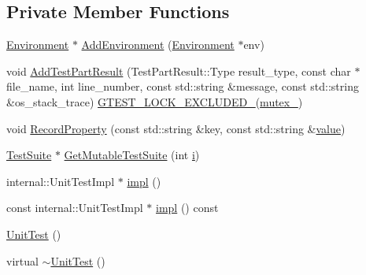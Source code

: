 \subsection*{Private Member Functions}
\begin{DoxyCompactItemize}
\item 
\mbox{\hyperlink{classtesting_1_1_environment}{Environment}} $\ast$ \mbox{\hyperlink{classtesting_1_1_unit_test_a1eb8e999b8696889bf1c64b4f0161203}{Add\+Environment}} (\mbox{\hyperlink{classtesting_1_1_environment}{Environment}} $\ast$env)
\item 
void \mbox{\hyperlink{classtesting_1_1_unit_test_a1d157d2e9a5c1d3405333410c6b13932}{Add\+Test\+Part\+Result}} (Test\+Part\+Result\+::\+Type result\+\_\+type, const char $\ast$file\+\_\+name, int line\+\_\+number, const std\+::string \&message, const std\+::string \&os\+\_\+stack\+\_\+trace) \mbox{\hyperlink{_obj__test_2lib_2googletest-release-1_88_81_2googletest_2include_2gtest_2internal_2gtest-port_8h_a69abff5a4efdd07bd5faebe3dd318d06}{G\+T\+E\+S\+T\+\_\+\+L\+O\+C\+K\+\_\+\+E\+X\+C\+L\+U\+D\+E\+D\+\_\+}}(\mbox{\hyperlink{classtesting_1_1_unit_test_abb94ef45cf0ab43be81ac6d5b1364132}{mutex\+\_\+}})
\item 
void \mbox{\hyperlink{classtesting_1_1_unit_test_a2c96a4a02c34095e07c6999e7686367f}{Record\+Property}} (const std\+::string \&key, const std\+::string \&\mbox{\hyperlink{_obj__test_2lib_2googletest-master_2googlemock_2test_2gmock-matchers__test_8cc_a337b8a670efc0b086ad3af163f3121b6}{value}})
\item 
\mbox{\hyperlink{classtesting_1_1_test_suite}{Test\+Suite}} $\ast$ \mbox{\hyperlink{classtesting_1_1_unit_test_a953e83b2f3c275a809150f73c83a3d0c}{Get\+Mutable\+Test\+Suite}} (int \mbox{\hyperlink{_obj__test_2lib_2googletest-master_2googlemock_2test_2gmock-matchers__test_8cc_acb559820d9ca11295b4500f179ef6392}{i}})
\item 
internal\+::\+Unit\+Test\+Impl $\ast$ \mbox{\hyperlink{classtesting_1_1_unit_test_a4df5d11a58affb337d7fa62eaa07690e}{impl}} ()
\item 
const internal\+::\+Unit\+Test\+Impl $\ast$ \mbox{\hyperlink{classtesting_1_1_unit_test_a266a9f49070d1959c1c9d649423879b4}{impl}} () const
\item 
\mbox{\hyperlink{classtesting_1_1_unit_test_a5e646d37f980429c310af696c8775f5c}{Unit\+Test}} ()
\item 
virtual \mbox{\hyperlink{classtesting_1_1_unit_test_a8b66a9332e29673a6a389ea1731ee6b2}{$\sim$\+Unit\+Test}} ()
\item 

\end{DoxyCompactItemize}
